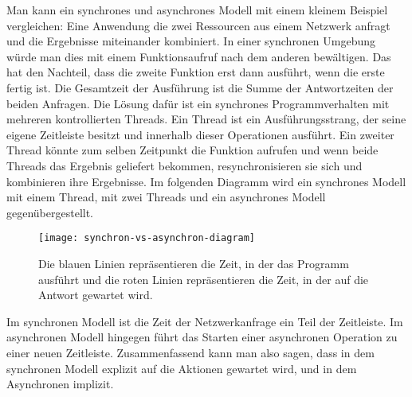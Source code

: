 \noindent
Man kann ein synchrones und asynchrones Modell mit einem kleinem Beispiel vergleichen: Eine Anwendung die zwei Ressourcen aus einem Netzwerk anfragt und die Ergebnisse miteinander kombiniert. In einer synchronen Umgebung würde man dies mit einem Funktionsaufruf nach dem anderen bewältigen. Das hat den Nachteil, dass die zweite Funktion erst dann ausführt, wenn die erste fertig ist. Die Gesamtzeit der Ausführung ist die Summe der Antwortzeiten der beiden Anfragen. Die Lösung dafür ist ein synchrones Programmverhalten mit mehreren kontrollierten Threads. Ein Thread ist ein Ausführungsstrang, der seine eigene Zeitleiste besitzt und innerhalb dieser Operationen ausführt. Ein zweiter Thread könnte zum selben Zeitpunkt die Funktion aufrufen und wenn beide Threads das Ergebnis geliefert bekommen, resynchronisieren sie sich und kombinieren ihre Ergebnisse\cite{asynchronitaet}. Im folgenden Diagramm wird ein synchrones Modell mit einem Thread, mit zwei Threads und ein asynchrones Modell gegenübergestellt.

\begin{center}
\begin{figure}[H]
\texttt{[image: synchron-vs-asynchron-diagram]}
\caption{Die blauen Linien repräsentieren die Zeit, in der das Programm ausführt und die roten Linien repräsentieren die Zeit, in der auf die Antwort gewartet wird.}
\end{figure}
\end{center}

\noindent
Im synchronen Modell ist die Zeit der Netzwerkanfrage ein Teil der Zeitleiste. Im asynchronen Modell hingegen führt das Starten einer asynchronen Operation zu einer neuen Zeitleiste. Zusammenfassend kann man also sagen, dass in dem synchronen Modell explizit auf die Aktionen gewartet wird, und in dem Asynchronen implizit.